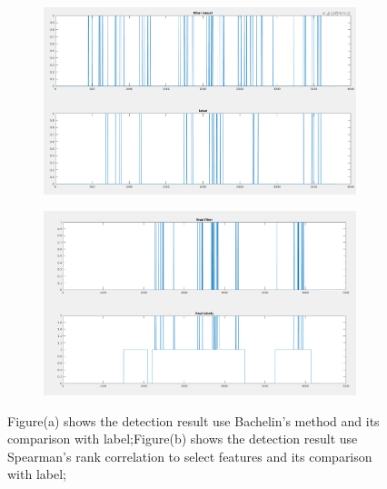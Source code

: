 \documentclass[article]{article}
\begin{document}
 
    
    \begin{figure}
    \begin{center}
    	
    	\begin{subfigure}[b]{0.45\textwidth}
    		\centering
    		\includegraphics[width=\textwidth]{method1}
    		\caption{}
    	
    	\end{subfigure}
    	\hfill
    	\begin{subfigure}[b]{0.45\textwidth}
    		\centering
    		\includegraphics[width=\textwidth]{method2}
    		\caption{}
    		
    	\end{subfigure}
    	   	
    	\caption{Figure(a) shows the detection result use Bachelin's method and its comparison with label;Figure(b) shows the detection result use Spearman's rank correlation to select features and its comparison with label;}
    	\label{result}
 \end{center}	
   
 \end{figure}
    
\end{document}
